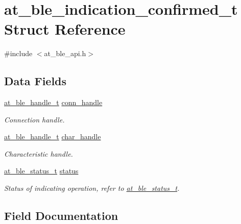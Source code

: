 \hypertarget{structat__ble__indication__confirmed__t}{}\section{at\+\_\+ble\+\_\+indication\+\_\+confirmed\+\_\+t Struct Reference}
\label{structat__ble__indication__confirmed__t}


{\ttfamily \#include $<$at\+\_\+ble\+\_\+api.\+h$>$}

\subsection*{Data Fields}
\begin{DoxyCompactItemize}
\item 
\mbox{\hyperlink{at__ble__api_8h_abd23646d0c662860741f787efc8456f2}{at\+\_\+ble\+\_\+handle\+\_\+t}} \mbox{\hyperlink{structat__ble__indication__confirmed__t_ae42df6fd8493f8f8faeccfdd6062e96f}{conn\+\_\+handle}}
\begin{DoxyCompactList}\small\item\em Connection handle. \end{DoxyCompactList}\item 
\mbox{\hyperlink{at__ble__api_8h_abd23646d0c662860741f787efc8456f2}{at\+\_\+ble\+\_\+handle\+\_\+t}} \mbox{\hyperlink{structat__ble__indication__confirmed__t_abf2dd98b1df5d9471f3e18780eb5e5a7}{char\+\_\+handle}}
\begin{DoxyCompactList}\small\item\em Characteristic handle. \end{DoxyCompactList}\item 
\mbox{\hyperlink{group__error__codes__group_ga3b1db9b95feb157b3c188ca27fe76988}{at\+\_\+ble\+\_\+status\+\_\+t}} \mbox{\hyperlink{structat__ble__indication__confirmed__t_a0b48093fc2030779fc47e5216f8019e2}{status}}
\begin{DoxyCompactList}\small\item\em Status of indicating operation, refer to \mbox{\hyperlink{at__ble__api_8h_ace24eb4e5ca3f325c663b809da5feb92}{at\+\_\+ble\+\_\+status\+\_\+t}}. \end{DoxyCompactList}\end{DoxyCompactItemize}


\subsection{Field Documentation}
\mbox{\label{structat__ble__indication__confirmed__t_abf2dd98b1df5d9471f3e18780eb5e5a7}} 
